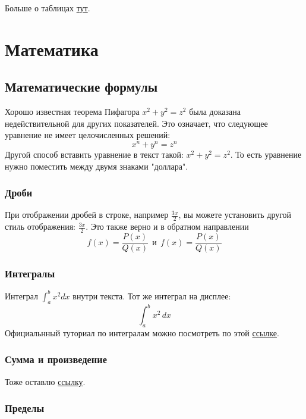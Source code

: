 Больше о таблицах \href{https://www.overleaf.com/learn/latex/Tables}{тут}.

\section{Математика}

    \subsection{Математические формулы}
    Хорошо известная теорема Пифагора \(x^2 + y^2 = z^2\) была
    доказана недействительной для других показателей.
    Это означает, что следующее уравнение не имеет целочисленных решений:
    \[ x^n + y^n = z^n \]
    Другой способ вставить уравнение в текст такой: $x^2 + y^2 = z^2$. То есть уравнение нужно поместить между двумя знаками "доллара".

    \subsubsection{Дроби}
    При отображении дробей в строке, например \(\frac{3x}{2}\),
    вы можете установить другой стиль отображения:
    \( \displaystyle \frac{3x}{2} \).
    Это также верно и в обратном направлении
    \[ f(x)=\frac{P(x)}{Q(x)} \ \ \textrm{и}
    \ \ f(x)=\textstyle\frac{P(x)}{Q(x)} \]

    \subsubsection{Интегралы}
    Интеграл \(\int_{a}^{b} x^2 dx\) внутри текста.
    \medskip
    Тот же интеграл на дисплее:
    \[
    \int_{a}^{b} x^2 \,dx
    \]
    Официальнный туториал по интегралам можно посмотреть по этой  \href{https://www.overleaf.com/learn/latex/Integrals,_sums_and_limits#Integrals}{ссылке}.

    \subsubsection{Сумма и произведение}
    Тоже оставлю \href{https://www.overleaf.com/learn/latex/Integrals,_sums_and_limits#Sums_and_products}{ссылку}.
    
    \subsubsection{Пределы}
    
